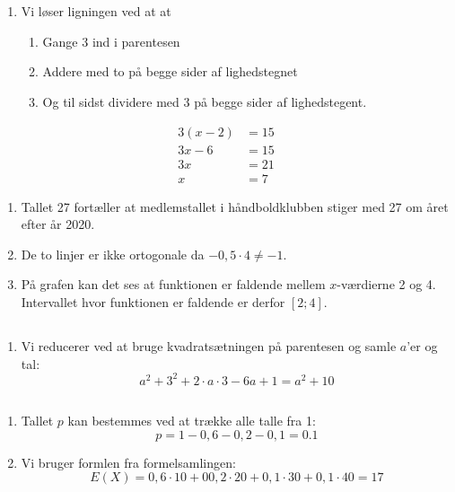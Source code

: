 \documentclass[10pt,a4paper,table]{article}
\begin{document}
\thispagestyle{plain}

\section{}
\subsection{}
\begin{enumerate}
  \item Vi løser ligningen ved at at
    \begin{enumerate}[label=\arabic*.]
      \item Gange 3 ind i parentesen
      \item Addere med to på begge sider af lighedstegnet
      \item Og til sidst dividere med 3 på begge sider af lighedstegent.
    \end{enumerate}
  \end{enumerate}

\begin{align*}
  3(x-2)&=15\\
  3x-6&=15\\
  3x&=21\\
  x&=7
\end{align*}

\begin{enumerate}[resume]
  \item Tallet 27 fortæller at medlemstallet i håndboldklubben stiger med 27 om året efter år 2020.
  \item De to linjer er ikke ortogonale da $-0,5\cdot 4\neq-1$.
  \item På grafen kan det ses at funktionen er faldende mellem $x$-værdierne 2 og 4. Intervallet hvor funktionen er faldende er derfor $[2;4]$.
  \end{enumerate}

\subsection{}
\begin{enumerate}
  \item Vi reducerer ved at bruge kvadratsætningen på parentesen og samle $a$'er og tal: $$a^2 + 3^2 + 2\cdot a \cdot 3 - 6a + 1 = a^2 + 10 $$
\end{enumerate}

\subsection{}
\begin{enumerate}
  \item Tallet $p$ kan bestemmes ved at trække alle talle fra 1:
    $$p=1-0,6-0,2-0,1=0.1$$
  \item Vi bruger formlen fra formelsamlingen: $$E(X)=0,6\cdot 10 + 0 0,2\cdot20 + 0,1\cdot 30 + 0,1 \cdot 40 = 17$$
\end{enumerate}
\end{document}
